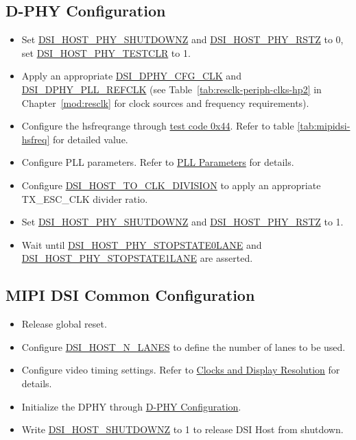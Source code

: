 \documentclass[main\_\_EN.tex]{subfiles}
\begin{document}
\subsection{D-PHY Configuration}
\label{sec:mipidsi-dsi-dphy-programming-proc}
\begin{itemize}
    \item Set \hyperref[fielddesc:DSIHOSTPHYSHUTDOWNZ]{DSI\_HOST\_PHY\_SHUTDOWNZ} and \hyperref[fielddesc:DSIHOSTPHYRSTZ]{DSI\_HOST\_PHY\_RSTZ} to 0, set \hyperref[fielddesc:DSIHOSTPHYTESTCLR]{DSI\_HOST\_PHY\_TESTCLR} to 1.
    \item Apply an appropriate \hyperref[clk:dsi-dphy-cfg-clk]{DSI\_DPHY\_CFG\_CLK} and \hyperref[clk:dsi-dphy-pll-refclk]{DSI\_DPHY\_PLL\_REFCLK} (see Table~\ref{tab:resclk-periph-clks-hp2} in Chapter~\ref{mod:resclk} \textit{} for clock sources and frequency requirements).
    \item Configure the hsfreqrange through \hyperref[sec:test-code-0x44]{test code 0x44}. Refer to table \ref{tab:mipidsi-hsfreq} for detailed value.
    \item Configure PLL parameters. Refer to \hyperref[sec:pll-parameters]{PLL Parameters} for details.
    \item Configure \hyperref[fielddesc:DSIHOSTTOCLKDIVISION]{DSI\_HOST\_TO\_CLK\_DIVISION} to apply an appropriate TX\_ESC\_CLK divider ratio.
    \item Set \hyperref[fielddesc:DSIHOSTPHYSHUTDOWNZ]{DSI\_HOST\_PHY\_SHUTDOWNZ} and \hyperref[fielddesc:DSIHOSTPHYRSTZ]{DSI\_HOST\_PHY\_RSTZ} to 1.
    \item Wait until \hyperref[fielddesc:DSIHOSTPHYSTOPSTATE0LANE]{DSI\_HOST\_PHY\_STOPSTATE0LANE} and \hyperref[fielddesc:DSIHOSTPHYSTOPSTATE1LANE]{DSI\_HOST\_PHY\_STOPSTATE1LANE} are asserted.
\end{itemize}

\subsection{MIPI DSI Common Configuration}
\label{sec:mipidsi-dsi-common-programming-proc}
\begin{itemize}
    \item Release global reset.
    \item Configure \hyperref[fielddesc:DSIHOSTNLANES]{DSI\_HOST\_N\_LANES} to define the number of lanes to be used.
    \item Configure video timing settings. Refer to \hyperref[sec:clocks-and-display-resolution]{Clocks and Display Resolution} for details.
    \item Initialize the DPHY through \hyperref[sec:mipidsi-dsi-dphy-programming-proc]{D-PHY Configuration}.
    \item Write \hyperref[fielddesc:DSIHOSTSHUTDOWNZ]{DSI\_HOST\_SHUTDOWNZ} to 1 to release DSI Host from shutdown.
\end{itemize}
\end{document}

